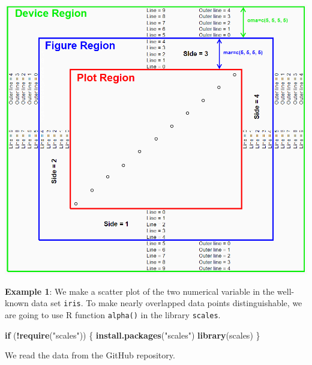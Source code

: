 \documentclass[
]{book}
\newenvironment{Shaded}{\begin{snugshade}}{\end{snugshade}}
\newcommand{\ControlFlowTok}[1]{\textcolor[rgb]{0.13,0.29,0.53}{\textbf{#1}}}
\newcommand{\FunctionTok}[1]{\textcolor[rgb]{0.13,0.29,0.53}{\textbf{#1}}}
\newcommand{\NormalTok}[1]{#1}
\newcommand{\SpecialCharTok}[1]{\textcolor[rgb]{0.81,0.36,0.00}{\textbf{#1}}}
\newcommand{\StringTok}[1]{\textcolor[rgb]{0.31,0.60,0.02}{#1}}
\begin{document}
\begin{center}\includegraphics[width=0.75\linewidth]{img02/w02-RGraphicMargins} \end{center}

\textbf{Example 1}: We make a scatter plot of the two numerical variable in the well-known data set \texttt{iris}. To make nearly overlapped data points distinguishable, we are going to use R function \texttt{alpha()} in the library \texttt{scales}.

\begin{Shaded}
\begin{Highlighting}[]
\ControlFlowTok{if}\NormalTok{ (}\SpecialCharTok{!}\FunctionTok{require}\NormalTok{(}\StringTok{"scales"}\NormalTok{)) \{}
   \FunctionTok{install.packages}\NormalTok{(}\StringTok{"scales"}\NormalTok{)}
   \FunctionTok{library}\NormalTok{(scales)}
\NormalTok{\}}
\end{Highlighting}
\end{Shaded}

We read the data from the GitHub repository.
\end{document}
